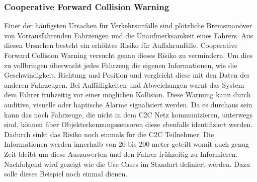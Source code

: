\subsubsection{Cooperative Forward Collision Warning}
Einer der häufigsten Ursachen für Verkehrsunfälle sind plötzliche Bremsmanöver von Vorrausfahrenden Fahrzeugen und die Unaufmerksamkeit eines Fahrers. Aus diesen Ursachen besteht ein erhöhtes Risiko für Auffahrunfälle. Cooperative Forward Collision Warning versucht genau dieses Risiko zu vermindern. Um dies zu vollbringen überwacht jedes Fahrzeug die eigenen Informationen, wie die Geschwindigkeit, Richtung und Position und vergleicht diese mit den Daten der anderen Fahrzeugen. Bei Auffälligkeiten und Abweichungen warnt das System dem Fahrer frühzeitig vor einer möglichen Kollision. Diese Warnung kann durch auditive, visuelle oder haptische Alarme signalisiert werden. Da es durchaus sein kann das noch Fahrzeuge, die nicht in dem C2C Netz kommunizieren, unterwegs sind, können über Objekterkennungssensoren diese ebenfalls identifiziert werden. Dadurch sinkt das Risiko noch einmals für die C2C Teilnehmer. Die Informationen werden innerhalb von 20 bis 200 meter geteilt womit auch genug Zeit bleibt um diese Auszuwerten und den Fahrer frühzeitig zu Informieren. \\
Nachfolgend wird gezeigt wie die Use Cases im Standart definiert werden. Dazu solle dieses Beispiel noch einmal dienen.

